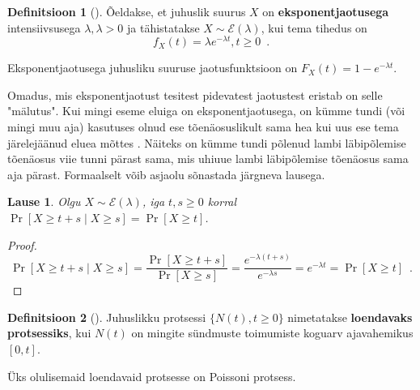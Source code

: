 \documentclass{article}
\newtheorem{lemma}[theorem]{Lause}
\theoremstyle{definition}
\newtheorem{definition}{Definitsioon}
\newcommand{\prob}[1]{\Pr\left[#1\right]}
\begin{document}
\begin{definition}[\cite{tõenäosusteooria-algkursus}]
    Õeldakse, et juhuslik suurus $X$ on \textbf{eksponentjaotusega} intensiivsusega $\lambda , \lambda > 0$ ja tähistatakse $X \sim \mathcal{E}(\lambda)$, kui tema tihedus on
    \begin{equation*}
        f_X(t) = \lambda e^{- \lambda t} , t \geq 0 \enspace .
    \end{equation*}
\end{definition}

Eksponentjaotusega juhusliku suuruse jaotusfunktsioon on $F_X(t) = 1 - e^{- \lambda t}$.

Omadus, mis eksponentjaotust tesitest pidevatest jaotustest eristab on selle "mälutus". Kui mingi eseme eluiga on eksponentjaotusega, on kümme tundi (või mingi muu aja) kasutuses olnud ese tõenäosuslikult sama hea kui uus ese tema järelejäänud eluea mõttes \cite[lk 291]{introduction-to-probability-models}. Näiteks on kümme tundi põlenud lambi läbipõlemise tõenäosus viie tunni pärast sama, mis uhiuue lambi läbipõlemise tõenäosus sama aja pärast. Formaalselt võib asjaolu sõnastada järgneva lausega.

\begin{lemma}
    Olgu $X \sim \mathcal{E}(\lambda)$, iga $t, s \geq 0$ korral $\prob{X \geq t + s \mid X \geq s} = \prob{X \geq t}$.
\end{lemma}

\begin{proof}
    \begin{equation*}
        \prob{X \geq t + s \mid X \geq s} = \frac{\prob{X \geq t + s}}{\prob{X \geq s}} = \frac{e^{- \lambda (t + s)}}{e^{- \lambda s}} = e^{- \lambda t} = \prob{X \geq t} \enspace .
    \end{equation*}
\end{proof}

\begin{definition}[\cite{juhuslikud-protsessid}]
    Juhuslikku protsessi $\{ N(t) , t \geq 0 \}$ nimetatakse \textbf{loendavaks protsessiks}, kui $N(t)$ on mingite sündmuste toimumiste koguarv ajavahemikus $[0, t]$.
\end{definition}

Üks olulisemaid loendavaid protsesse on Poissoni protsess.
\end{document}
